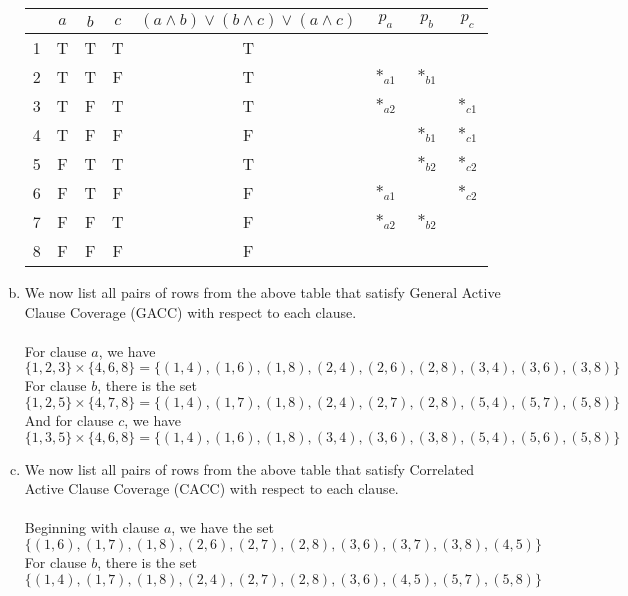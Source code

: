 \documentclass{article}
\begin{document}
\begin{enumerate}[(a)]
		\begin{center}
			\begin{tabular}{|c|c|c|c||c|c|c|c|} 
				\hline
				& $a$ & $b$ & $c$ & $ ( a \land b ) \lor ( b \land c ) \lor ( a \land c ) $ & $p_a$ & $p_b$ & $p_c$ \\ [1ex] 
				\hline
				1 & T & T & T & T & 	     & 			&  		   \\
				\hline
				2 & T & T & F & T & $*_{a1}$ & $*_{b1}$ &  		   \\
				\hline
				3 & T & F & T & T & $*_{a2}$ & 			& $*_{c1}$ \\
				\hline
				4 & T & F & F & F & 	 	 & $*_{b1}$ & $*_{c1}$ \\
				\hline
				5 & F & T & T & T & 		 & $*_{b2}$ & $*_{c2}$ \\
				\hline
				6 & F & T & F & F & $*_{a1}$ &  		& $*_{c2}$ \\
				\hline
				7 & F & F & T & F & $*_{a2}$ & $*_{b2}$ &  		   \\
				\hline
				8 & F & F & F & F & 		 &  		&  		   \\
				\hline
			\end{tabular}
		\end{center}
	\item We now list all pairs of rows from the above table that satisfy General Active Clause Coverage (GACC) with respect to each clause. \\\\
	For clause $a$, we have
		$$ \{ 1, 2, 3 \} \times \{ 4, 6, 8 \} = \{ (1, 4), (1, 6), (1, 8),
												   (2, 4), (2, 6), (2, 8),
												   (3, 4), (3, 6), (3, 8) \} $$
	For clause $b$, there is the set
		$$ \{ 1, 2, 5 \} \times \{ 4, 7, 8 \} = \{ (1, 4), (1, 7), (1, 8),
												   (2, 4), (2, 7), (2, 8),
												   (5, 4), (5, 7), (5, 8) \} $$
	And for clause $c$, we have
		$$ \{ 1, 3, 5 \} \times \{ 4, 6, 8 \} = \{ (1, 4), (1, 6), (1, 8), 
												   (3, 4), (3, 6), (3, 8),
												   (5, 4), (5, 6), (5, 8) \} $$
	\item  We now list all pairs of rows from the above table that satisfy Correlated Active Clause Coverage (CACC) with respect to each clause. \\\\
	Beginning with clause $a$, we have the set 
		$$ \{ (1, 6), (1, 7), (1, 8),
			  (2, 6), (2, 7), (2, 8),
			  (3, 6), (3, 7), (3, 8),
			  (4, 5) \} $$
	For clause $b$, there is the set
		$$ \{ (1, 4), (1, 7), (1, 8),
			  (2, 4), (2, 7), (2, 8),
			  (3, 6),
			  (4, 5),
			  (5, 7), (5, 8) \} $$

\end{enumerate}
\end{document}
